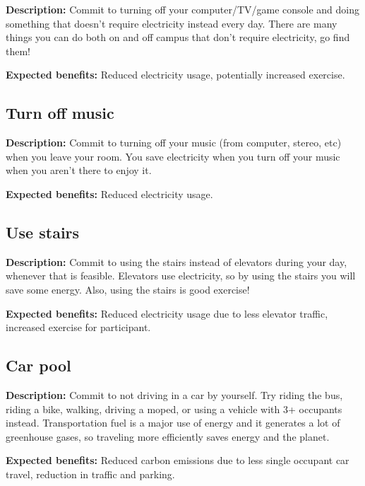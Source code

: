 \textbf{Description:} Commit to turning off your computer/TV/game console and doing something that doesn't require electricity instead every day. There are many things you can do both on and off campus that don't require electricity, go find them!

\vspace{2ex}
\textbf{Expected benefits:} Reduced electricity usage, potentially increased exercise.


\subsection{Turn off music}

\textbf{Description:} Commit to turning off your music (from computer, stereo, etc) when you leave your room. You save electricity when you turn off your music when you aren't there to enjoy it.

\vspace{2ex}
\textbf{Expected benefits:} Reduced electricity usage.


\subsection{Use stairs}

\textbf{Description:} Commit to using the stairs instead of elevators during your day, whenever that is feasible. Elevators use electricity, so by using the stairs you will save some energy. Also, using the stairs is good exercise!

\vspace{2ex}
\textbf{Expected benefits:} Reduced electricity usage due to less elevator traffic, increased exercise for participant.


\subsection{Car pool}

\textbf{Description:} Commit to not driving in a car by yourself. Try riding the bus, riding a bike, walking, driving a moped, or using a vehicle with 3+ occupants instead. Transportation fuel is a major use of energy and it generates a lot of greenhouse gases, so traveling more efficiently saves energy and the planet.

\vspace{2ex}
\textbf{Expected benefits:} Reduced carbon emissions due to less single occupant car travel, reduction in traffic and parking.


